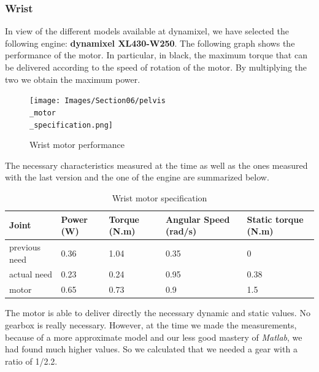 \subsubsection{Wrist}

In view of the different models available at dynamixel, we have selected the following engine: \textbf{dynamixel XL430-W250}. The following graph shows the performance of the motor. In particular, in black, the maximum torque that can be delivered according to the speed of rotation of the motor. By multiplying the two we obtain the maximum power.
\begin{figure}[ht]
    \centering
    \texttt{[image: Images/Section06/pelvis\\\_motor\\\_specification.png]}
    \caption{Wrist motor performance}
    \label{fig:WristMotor}
\end{figure}
\FloatBarrier

\bigbreak
The necessary characteristics measured at the time as well as the ones measured with the last version and the one of the engine are summarized below.
\begin{table}[ht]
    \centering
    \begin{tabular}{|p{1.5cm} | p{2cm} | p{2.5cm}| p{2.7cm} | p{2.7cm} |} 
        \hline
        \textbf{Joint}& \textbf{Power (W)} & \textbf{Torque (N.m)} & \textbf{Angular Speed (rad/s)} & \textbf{Static torque (N.m)}\\ [0.3ex]
        \hline
        previous need & 0.36 & 1.04 & 0.35 & 0 \\ 
        \hline
        actual need & 0.23 & 0.24 & 0.95 & 0.38 \\ 
        \hline
        motor & 0.65 & 0.73 & 0.9 & 1.5\\ 
        \hline
    \end{tabular}
    \caption{Wrist motor specification}
\end{table}
\FloatBarrier
The motor is able to deliver directly the necessary dynamic and static values. No gearbox is really necessary. However, at the time we made the measurements, because of a more approximate model and our less good mastery of \textit{Matlab}, we had found much higher values. So we calculated that we needed a gear with a ratio of 1/2.2.